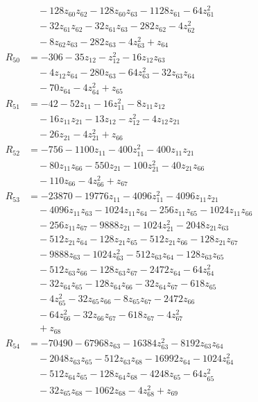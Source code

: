 \begin{align*}
&\quad -128z_{60}z_{62} -128z_{60}z_{63} -1128z_{61} -64z_{61}^{2} \\
&\quad -32z_{61}z_{62} -32z_{61}z_{63} -282z_{62} -4z_{62}^{2} \\
&\quad -8z_{62}z_{63} -282z_{63} -4z_{63}^{2} +z_{64} \\
R_{50} &= -306 -35z_{12} -z_{12}^{2} -16z_{12}z_{63} \\
&\quad -4z_{12}z_{64} -280z_{63} -64z_{63}^{2} -32z_{63}z_{64} \\
&\quad -70z_{64} -4z_{64}^{2} +z_{65} \\
R_{51} &= -42 -52z_{11} -16z_{11}^{2} -8z_{11}z_{12} \\
&\quad -16z_{11}z_{21} -13z_{12} -z_{12}^{2} -4z_{12}z_{21} \\
&\quad -26z_{21} -4z_{21}^{2} +z_{66} \\
R_{52} &= -756 -1100z_{11} -400z_{11}^{2} -400z_{11}z_{21} \\
&\quad -80z_{11}z_{66} -550z_{21} -100z_{21}^{2} -40z_{21}z_{66} \\
&\quad -110z_{66} -4z_{66}^{2} +z_{67} \\
R_{53} &= -23870 -19776z_{11} -4096z_{11}^{2} -4096z_{11}z_{21} \\
&\quad -4096z_{11}z_{63} -1024z_{11}z_{64} -256z_{11}z_{65} -1024z_{11}z_{66} \\
&\quad -256z_{11}z_{67} -9888z_{21} -1024z_{21}^{2} -2048z_{21}z_{63} \\
&\quad -512z_{21}z_{64} -128z_{21}z_{65} -512z_{21}z_{66} -128z_{21}z_{67} \\
&\quad -9888z_{63} -1024z_{63}^{2} -512z_{63}z_{64} -128z_{63}z_{65} \\
&\quad -512z_{63}z_{66} -128z_{63}z_{67} -2472z_{64} -64z_{64}^{2} \\
&\quad -32z_{64}z_{65} -128z_{64}z_{66} -32z_{64}z_{67} -618z_{65} \\
&\quad -4z_{65}^{2} -32z_{65}z_{66} -8z_{65}z_{67} -2472z_{66} \\
&\quad -64z_{66}^{2} -32z_{66}z_{67} -618z_{67} -4z_{67}^{2} \\
&\quad +z_{68} \\
R_{54} &= -70490 -67968z_{63} -16384z_{63}^{2} -8192z_{63}z_{64} \\
&\quad -2048z_{63}z_{65} -512z_{63}z_{68} -16992z_{64} -1024z_{64}^{2} \\
&\quad -512z_{64}z_{65} -128z_{64}z_{68} -4248z_{65} -64z_{65}^{2} \\
&\quad -32z_{65}z_{68} -1062z_{68} -4z_{68}^{2} +z_{69} \\

\end{align*}
